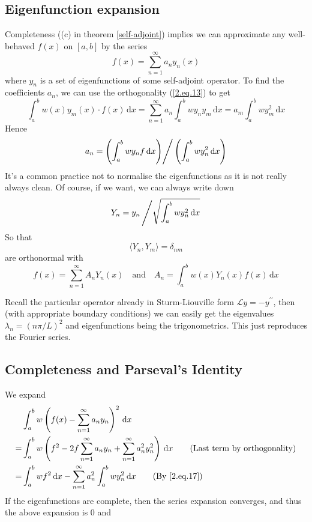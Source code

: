 \documentclass[a4paper]{article}
\begin{document}
\subsection{Eigenfunction expansion}
Completeness ((c) in theorem \ref{self-adjoint}) implies we can approximate any well-behaved $f(x)$ on $ [a,b] $ by the series 
\begin{equation}
    f(x)=\sum_{n=1}^\infty a_ny_n(x)
\end{equation}
where $y_n$ is a set of eigenfunctions of some self-adjoint operator.
To find the coefficients $a_n$, we can use the orthogonality (\ref{2.eq.13}) to get
\[
    \int_{a}^{b} w(x)y_m(x)\cdot f(x) \,\mathrm{d}x = \sum_{n=1}^{\infty}a_n \int_{a}^{b} wy_ny_m \,\mathrm{d}x = a_m\int_a^bwy_m^2\,\mathrm dx
\]
Hence 
\begin{equation}\label{2.eq.17}
    a_n=\left(\int_a^bwy_nf\,\mathrm dx\middle)\right/\left(\int_a^bwy_n^2\,\mathrm dx\right)
\end{equation}
It's a common practice not to normalise the eigenfunctions as it is not really always clean.
Of course, if we want, we can always write down
\[
    Y_n=y_n\left/\sqrt{\int_a^bwy_n^2\,\mathrm dx}\right.
\]
So that 
\begin{equation}
    \langle Y_n,Y_m \rangle =\delta_{nm}
\end{equation}
are orthonormal with 
\[
    f(x) = \sum_{n=1}^{\infty}A_nY_n(x)\quad \text{and}\quad A_n = \int_{a}^{b} w(x)Y_n(x)f(x) \,\mathrm{d}x
\]
\begin{example}
    Recall the particular operator already in Sturm-Liouville form $\mathcal Ly=-y^{\prime\prime}$, then (with appropriate boundary conditions) we can easily get the eigenvalues $\lambda_n=(n\pi/L)^2$ and eigenfunctions being the trigonometrics.
    This just reproduces the Fourier series.
\end{example}
\subsection{Completeness and Parseval's Identity}
We expand
\begin{align*}
    &\int_a^bw\left( f(x)-\sum_{n=1}^\infty a_ny_n \right)^2\,\mathrm dx\\
    =&\int_a^bw\left( f^2-2f\sum_{n=1}^\infty a_ny_n+\sum_{n=1}^\infty a_n^2y_n^2 \right)\,\mathrm dx\tag{Last term by orthogonality} \\    
    =&\int_a^bwf^2\,\mathrm dx-\sum_{n=1}^\infty a_n^2\int_a^bwy_n^2\,\mathrm dx\tag{By \ref{2.eq.17}}
\end{align*}
If the eigenfunctions are complete, then the series expansion converges, and thus the above expansion is 0 and 
\end{document}
